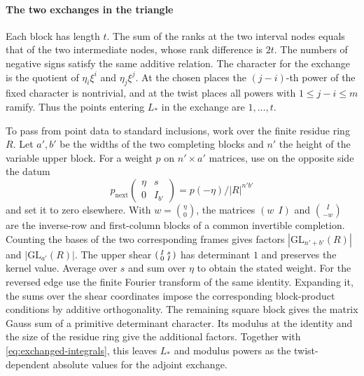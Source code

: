 \paragraph{The two exchanges in the triangle}
Each block has length \(t\). The sum of the ranks at the two interval
nodes equals that of the two intermediate nodes, whose rank difference
is \(2t\). The numbers of negative signs satisfy the same additive
relation. The character for the exchange is the quotient of
\(\eta_i\xi^i\) and \(\eta_j\xi^j\). At the chosen places the
\((j-i)\)-th power of the fixed character is nontrivial, and at the twist
places all powers with \(1\le j-i\le m\) ramify.
Thus the points entering \(L_*\) in the exchange are \(1,\ldots,t\).

To pass from point data to standard inclusions, work over the finite
residue ring \(R\). Let \(a',b'\) be the widths of the two completing
blocks and \(n'\) the height of the variable upper block. For a weight
\(p\) on \(n'\times a'\) matrices, use on the opposite side the datum
\[
 p_\mathrm{next}\begin{pmatrix}\eta&s\\0&I_{b'}\end{pmatrix}
     =p(-\eta)/|R|^{n'b'}
\]
and set it to zero elsewhere. With \(w=\binom{\eta}{0}\), the matrices
\((w\ \ I)\) and \(\binom{I}{-w}\) are the inverse-row and first-column
blocks of a common invertible completion. Counting the bases of the
two corresponding frames gives factors
\(|\mathrm{GL}_{n'+b'}(R)|\) and \(|\mathrm{GL}_{a'}(R)|\).
The upper shear \(\begin{psmallmatrix}I&s\\0&I\end{psmallmatrix}\) has
determinant \(1\) and preserves the kernel value. Average over \(s\) and
sum over \(\eta\) to obtain the stated weight.
For the reversed edge use the finite Fourier transform of the same
identity. Expanding it, the sums over the shear coordinates impose
the corresponding block-product conditions by additive orthogonality.
The remaining square block gives the matrix Gauss sum of a primitive
determinant character. Its modulus at the identity and the size of
the residue ring give the additional factors. Together with
\eqref{eq:exchanged-integrals}, this leaves \(L_*\) and modulus powers
as the twist-dependent absolute values for the adjoint exchange.


